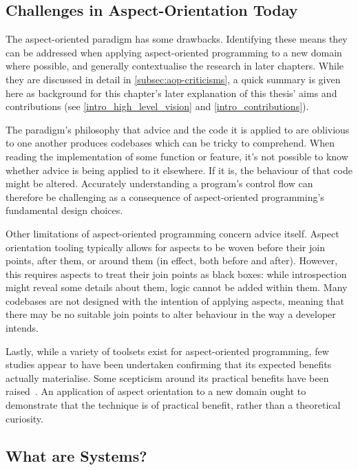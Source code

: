 \subsection{Challenges in Aspect-Orientation Today}

The aspect-oriented paradigm has some drawbacks. Identifying these means they
can be addressed when applying aspect-oriented programming to a new domain where
possible, and generally contextualise the research in later chapters. While they
are discussed in detail in \cref{subsec:aop-criticisms}, a quick summary is
given here as background for this chapter's later explanation of this thesis'
aims and contributions (see \cref{intro_high_level_vision} and
\cref{intro_contributions}).

The paradigm's philosophy that advice and the code it is applied to are
oblivious to one another produces codebases which can be tricky to comprehend.
When reading the implementation of some function or feature, it's not possible
to know whether advice is being applied to it elsewhere. If it is, the behaviour
of that code might be altered. Accurately understanding a program's control flow
can therefore be challenging as a consequence of aspect-oriented programming's
fundamental design choices.

Other limitations of aspect-oriented programming concern advice itself. Aspect
orientation tooling typically allows for aspects to be woven before their join
points, after them, or around them (in effect, both before and after). However,
this requires aspects to treat their join points as black boxes: while
introspection might reveal some details about them, logic cannot be added within
them. Many codebases are not designed with the intention of applying aspects,
meaning that there may be no suitable join points to alter behaviour in the way
a developer intends.

Lastly, while a variety of toolsets exist for aspect-oriented programming, few
studies appear to have been undertaken confirming that its expected benefits
actually materialise. Some scepticism around its practical benefits have been
raised~\cite{steimann06paradoxical,przybylek2010wrong,Constantinides04aopconsidered}.
An application of aspect orientation to a new domain ought to demonstrate
that the technique is of practical benefit, rather than a theoretical curiosity.



\subsection{What are \SocioTechnical Systems?}


